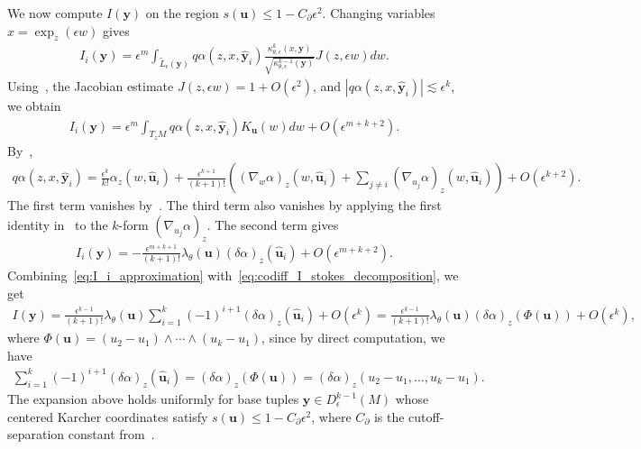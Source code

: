 \documentclass[11pt,reqno]{amsproc}
\numberwithin{equation}{section}
\newcommand{\by}{\mathbf{y}}
\newcommand{\bu}{\mathbf{u}}
\newcommand{\tL}{\widetilde{L}}
\newcommand{\ls}{\lesssim}
\theoremstyle{definition}
\theoremstyle{plain}
\begin{document}
We now compute $I(\by)$ on the region $s(\bu)\leq1-C_\partial\epsilon^2$. Changing variables $x=\exp_z(\epsilon w)$ gives
\begin{align}
    I_i(\by)=\epsilon^m\int_{\tL_\epsilon(\by)}q\alpha(z,x,\hat{\by}_i)\frac{\kappa^k_{\theta,\epsilon}(x,\by)}{\sqrt{\kappa^{k-1}_{\theta,\epsilon}(\by)}}J(z,\epsilon w)dw.
\end{align}
Using~, the Jacobian estimate $J(z,\epsilon w)=1+O(\epsilon^2)$, and $|q\alpha(z,x,\hat{\by}_i)|\ls \epsilon^k$, we obtain
\begin{align}
    I_i(\by)=\epsilon^m\int_{T_zM}q\alpha(z,x,\hat{\by}_i)K_\bu(w)dw+O(\epsilon^{m+k+2}).
\end{align}
By~,
\begin{align} \label{eq:codiff_stokes_simplex_expansion}
    q\alpha(z,x,\hat{\by}_i) = \frac{\epsilon^k}{k!}\alpha_z(w, \hat{\bu}_i) + \frac{\epsilon^{k+1}}{(k+1)!} \left( (\nabla_w \alpha)_z(w, \hat{\bu}_i) +  \sum_{j \neq i} (\nabla_{u_j} \alpha)_z(w, \hat{\bu}_i) \right) + O(\epsilon^{k+2}).
\end{align}
The first term vanishes by~. The third term also vanishes by applying the first identity in~ to the $k$-form $(\nabla_{u_j}\alpha)_z$. The second term gives
\begin{align} \label{eq:I_i_approximation}
    I_i(\by) = -\frac{\epsilon^{m+k+1}}{(k+1)!}\lambda_\theta(\bu)(\delta\alpha)_z(\hat{\bu}_i)+O(\epsilon^{m+k+2}).
\end{align}
Combining~\eqref{eq:I_i_approximation} with~\eqref{eq:codiff_I_stokes_decomposition}, we get
\begin{align} \label{eq:I_by_expansion}
    I(\by) = \frac{\epsilon^{k-1}}{(k+1)!}\lambda_\theta(\bu)\sum_{i=1}^k(-1)^{i+1}(\delta\alpha)_z(\hat{\bu}_i)+O(\epsilon^k) = \frac{\epsilon^{k-1}}{(k+1)!}\lambda_\theta(\bu)(\delta\alpha)_z(\Phi(\bu))+O(\epsilon^k),
\end{align}
where $\Phi(\bu)=(u_2-u_1)\wedge\cdots\wedge(u_k-u_1)$, since by direct computation, we have
\begin{align}
    \sum_{i=1}^k(-1)^{i+1}(\delta\alpha)_z(\hat{\bu}_i)=(\delta\alpha)_z(\Phi(\bu)) = (\delta\alpha)_z(u_2-u_1, \ldots, u_k-u_1).
\end{align}
The expansion above holds uniformly for base tuples $\by\in D^{k-1}_\epsilon(M)$ whose centered Karcher coordinates satisfy $s(\bu)\leq 1-C_\partial\epsilon^2$, where $C_\partial$ is the cutoff-separation constant from~. \medskip
\end{document}
